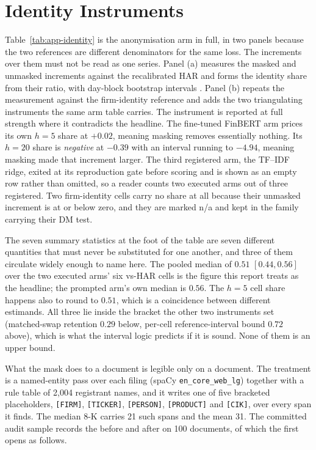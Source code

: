 \FloatBarrier
\section{Identity Instruments}
\label{app:res-identity}

Table~\ref{tab:app-identity} is the anonymisation arm in full, in two
panels because the two references are different denominators for the
same loss. The increments over them must not be read as one series.
Panel (a) measures the masked and unmasked increments against the
recalibrated HAR and forms the identity share from their ratio, with
day-block bootstrap intervals \cite{politis1994stationary}. Panel (b)
repeats the measurement against the firm-identity reference and adds the
two triangulating instruments the same arm table carries. The
instrument is reported at full strength where it contradicts the
headline. The fine-tuned FinBERT arm prices its own $h{=}5$ share at
$+0.02$, meaning masking removes essentially nothing. Its $h{=}20$
share is \emph{negative} at $-0.39$ with an interval running to $-4.94$,
meaning masking made that increment larger. The third registered arm,
the TF--IDF ridge, exited at its reproduction gate before scoring and is
shown as an empty row rather than omitted, so a reader counts two
executed arms out of three registered. Two firm-identity cells carry no
share at all because their unmasked increment is at or below zero, and
they are marked n/a and kept in the family carrying their DM test.

The seven summary statistics at the foot of the table are seven
different quantities that must never be substituted for one another, and three
of them circulate widely enough to name here. The
pooled median of $0.51$ $[0.44, 0.56]$ over the two executed arms' six
vs-HAR cells is the figure this report treats as the headline; the
prompted arm's own median is $0.56$. The $h{=}5$ cell share happens
also to round to $0.51$, which is a coincidence between different
estimands. All three lie inside the bracket the other two instruments
set (matched-swap retention $0.29$ below, per-cell reference-interval
bound $0.72$ above), which is what the interval logic predicts if it
is sound. None of them is an upper bound.

What the mask does to a document is legible only on a document. The
treatment is a named-entity pass over each filing (spaCy
\texttt{en\_core\_web\_lg}) together with a rule table of 2{,}004
registrant names, and it writes one of five bracketed placeholders,
\texttt{[FIRM]}, \texttt{[TICKER]}, \texttt{[PERSON]},
\texttt{[PRODUCT]} and \texttt{[CIK]}, over every span it finds. The
median 8-K carries 21 such spans and the mean 31. %
The committed audit sample records the before and after on 100 documents,
of which the first opens as follows. %

